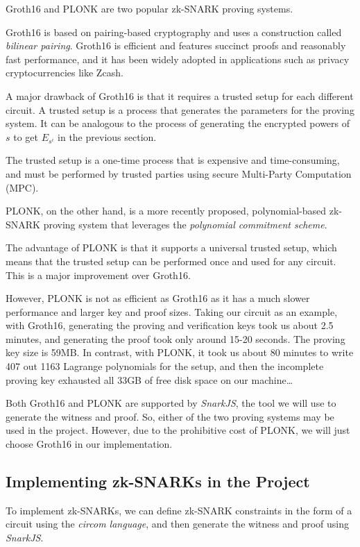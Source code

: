 \documentclass[
]{report}
\begin{document}
Groth16 and PLONK are two popular zk-SNARK proving systems.

Groth16 is based on pairing-based cryptography and uses a construction
called \emph{bilinear pairing}. Groth16 is efficient and features
succinct proofs and reasonably fast performance, and it has been widely
adopted in applications such as privacy cryptocurrencies like Zcash.

A major drawback of Groth16 is that it requires a trusted setup for each
different circuit. A trusted setup is a process that generates the
parameters for the proving system. It can be analogous to the process of
generating the encrypted powers of \(s\) to get \(E_{s^{i}}\) in the
previous section.

The trusted setup is a one-time process that is expensive and
time-consuming, and must be performed by trusted parties using secure
Multi-Party Computation (MPC).

PLONK, on the other hand, is a more recently proposed, polynomial-based
zk-SNARK proving system that leverages the \emph{polynomial commitment
scheme}.

The advantage of PLONK is that it supports a universal trusted setup,
which means that the trusted setup can be performed once and used for
any circuit. This is a major improvement over Groth16.

However, PLONK is not as efficient as Groth16 as it has a much slower
performance and larger key and proof sizes. Taking our circuit as an
example, with Groth16, generating the proving and verification keys took
us about 2.5 minutes, and generating the proof took only around 15-20
seconds. The proving key size is 59MB. In contrast, with PLONK, it took
us about 80 minutes to write 407 out 1163 Lagrange polynomials for the
setup, and then the incomplete proving key exhausted all 33GB of free
disk space on our machine\ldots{}

Both Groth16 and PLONK are supported by \emph{SnarkJS}, the tool we will
use to generate the witness and proof. So, either of the two proving
systems may be used in the project. However, due to the prohibitive cost
of PLONK, we will just choose Groth16 in our implementation.

\subsection{Implementing zk-SNARKs in the Project}

To implement zk-SNARKs, we can define zk-SNARK constraints in the form
of a circuit using the \emph{circom language}, and then generate the
witness and proof using \emph{SnarkJS}.
\end{document}
